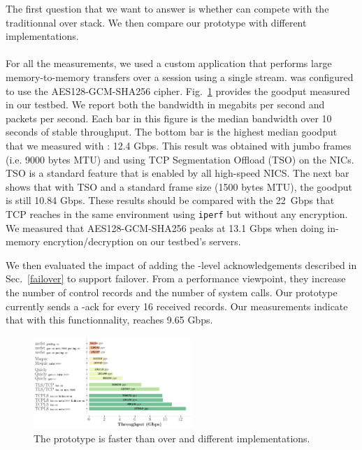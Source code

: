 The first question that we want to answer is whether \tcpls can compete with the traditionnal \tls over \tcp stack. We then compare our \tcpls prototype with different \quic implementations.


\paragraph*{\tcpls}
For all the \tcpls measurements, we used a custom application that performs
large memory-to-memory transfers over a \tcpls session using a single stream.
\tcpls was configured to use the AES128-GCM-SHA256 cipher.
Fig.~\ref{fig:perf} provides the goodput measured in our
testbed. We report both the bandwidth in megabits per second and packets per
second.  Each bar in this figure is the median bandwidth over 10 seconds of stable
throughput. The bottom bar is the highest median goodput that we measured with \tcpls:
12.4 Gbps. This result was obtained with jumbo frames (i.e. 9000 bytes MTU)
and using TCP Segmentation Offload (TSO) on the NICs. TSO is a standard feature
that is enabled by all high-speed NICS. The next bar shows that with TSO and a
standard frame size (1500 bytes MTU), the goodput is still 10.84 Gbps. These
results should be compared with the 22~Gbps that TCP reaches in the same
environment using \texttt{iperf} but without any encryption. We measured that
AES128-GCM-SHA256 peaks at 13.1 Gbps when doing in-memory encrytion/decryption on our
testbed's servers.


We then evaluated the impact of adding the \tcpls-level acknowledgements
described in Sec.~\ref{failover} to support failover.
From a performance viewpoint, they increase the number of control records and
the number of system calls. Our prototype currently sends a \tcpls-ack for every
16 received records. Our measurements indicate that with this functionnality,
\tcpls reaches 9.65 Gbps.


\begin{figure}[!t]
  \begin{center}
    \includegraphics[width=6cm]{figures/perf_analysis.png}
  \end{center}
\vspace{-0.5cm}
  \caption{The \tcpls prototype is faster than \tls over \tcp and different \quic implementations.}
  \label{fig:perf}
\end{figure}


